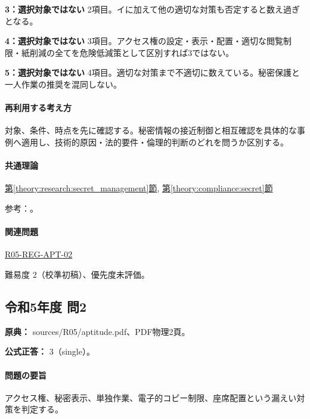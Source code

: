 \noindent\textbf{3：選択対象ではない} 2項目。イに加えて他の適切な対策も否定すると数え過ぎとなる。\par

\noindent\textbf{4：選択対象ではない} 3項目。アクセス権の設定・表示・配置・適切な閲覧制限・紙削減の全てを危険低減策として区別すれば3ではない。\par

\noindent\textbf{5：選択対象ではない} 4項目。適切な対策まで不適切に数えている。秘密保護と一人作業の推奨を混同しない。\par

\paragraph{再利用する考え方} 対象、条件、時点を先に確認する。秘密情報の接近制御と相互確認を具体的な事例へ適用し、技術的原因・法的要件・倫理的判断のどれを問うか区別する。

\paragraph{共通理論} \hyperref[theory:research:secret_management]{第\ref*{theory:research:secret_management}節}, \hyperref[theory:compliance:secret]{第\ref*{theory:compliance:secret}節}

\par 参考：\cite{meti_secret_handbook2024}。

\paragraph{関連問題} \hyperref[q:r05-reg-apt-02]{R05-REG-APT-02}

\par 難易度 2（校準初稿）、優先度未評価。

\subsection{令和5年度 問2}
\label{q:r05-reg-apt-02}

\noindent\textbf{原典：} sources/R05/aptitude.pdf、PDF物理2頁。

\textbf{公式正答：} 3（single）。

\paragraph{問題の要旨} アクセス権、秘密表示、単独作業、電子的コピー制限、座席配置という漏えい対策を判定する。

